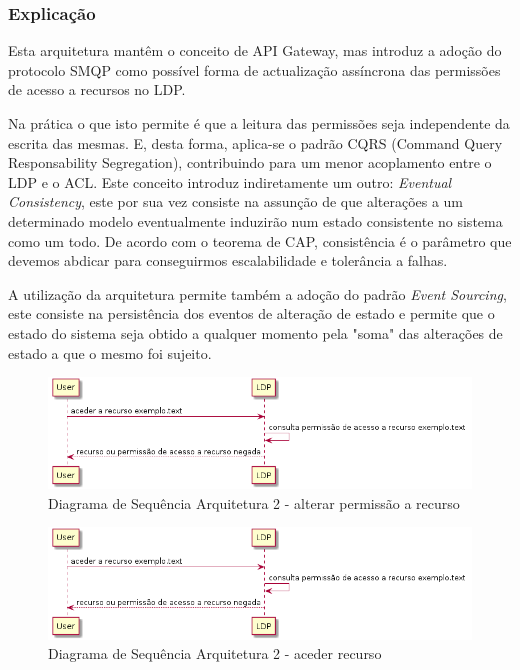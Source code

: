 \subsubsection{Explicação}

Esta arquitetura mantêm o conceito de API Gateway, mas introduz a adoção do protocolo SMQP como possível forma de actualização assíncrona das permissões de acesso a recursos no LDP.

Na prática o que isto permite é que a leitura das permissões seja independente da escrita das mesmas. E, desta forma, aplica-se o padrão CQRS (Command Query Responsability Segregation), contribuindo para um menor acoplamento entre o LDP e o ACL. Este conceito introduz indiretamente um outro: \emph{Eventual Consistency}, este por sua vez consiste na assunção de que alterações a um determinado modelo eventualmente induzirão num estado consistente no sistema como um todo. De acordo com o teorema de CAP, consistência é o parâmetro que devemos abdicar para conseguirmos escalabilidade e tolerância a falhas.

A utilização da arquitetura permite também a adoção do padrão \emph{Event Sourcing}, este consiste na persistência dos eventos de alteração de estado e permite que o estado do sistema seja obtido a qualquer momento pela "soma" das alterações de estado a que o mesmo foi sujeito.

\begin{figure}[h]
    \begin{center}
    \includegraphics[width=1 \textwidth]{figures/arquitetura_2_access_resource}
    \caption{Diagrama de Sequência Arquitetura 2 - alterar permissão a recurso}
    \end{center}
\end{figure}

\begin{figure}[h]
    \begin{center}
    \includegraphics[width=1 \textwidth]{figures/arquitetura_2_access_resource}
    \caption{Diagrama de Sequência Arquitetura 2 - aceder recurso}
    \end{center}
\end{figure}


